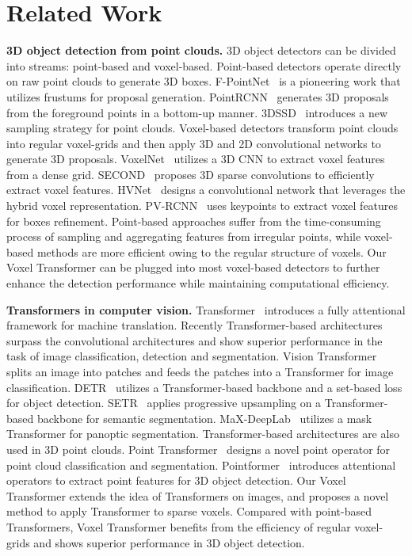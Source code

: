 \documentclass[10pt,twocolumn,letterpaper]{article}
\begin{document}
\section{Related Work}
\noindent\textbf{3D object detection from point clouds.} 3D object detectors can be divided into  streams: point-based and voxel-based. Point-based detectors operate directly on raw point clouds to generate 3D boxes. F-PointNet~\cite{qi2018frustum} is a pioneering work that utilizes frustums for proposal generation. PointRCNN~\cite{shi2019pointrcnn} generates 3D proposals from the foreground points in a bottom-up manner. 3DSSD~\cite{yang20203dssd} introduces a new sampling strategy for point clouds. Voxel-based detectors transform point clouds into regular voxel-grids and then apply 3D and 2D convolutional networks to generate 3D proposals. VoxelNet~\cite{zhou2018voxelnet} utilizes a 3D CNN to extract voxel features from a dense grid. SECOND~\cite{yan2018second} proposes 3D sparse convolutions to efficiently extract voxel features. HVNet~\cite{ye2020hvnet} designs a convolutional network that leverages the hybrid voxel representation. PV-RCNN~\cite{shi2020pv} uses keypoints to extract voxel features for boxes refinement. Point-based approaches suffer from the time-consuming process of sampling and aggregating features from irregular points, while voxel-based methods are more efficient owing to the regular structure of voxels. Our Voxel Transformer can be plugged into most voxel-based detectors to further enhance the detection performance while maintaining computational efficiency.

\noindent\textbf{Transformers in computer vision.} Transformer~\cite{vaswani2017attention} introduces a fully attentional framework for machine translation. Recently Transformer-based architectures surpass the convolutional architectures and show superior performance in the task of image classification, detection and segmentation. Vision Transformer~\cite{dosovitskiy2020image} splits an image into patches and feeds the patches into a Transformer for image classification. DETR~\cite{carion2020end} utilizes a Transformer-based backbone and a set-based loss for object detection. SETR~\cite{zheng2020rethinking} applies progressive upsampling on a Transformer-based backbone for semantic segmentation. MaX-DeepLab~\cite{wang2020max} utilizes a mask Transformer for panoptic segmentation. Transformer-based architectures are also used in 3D point clouds. Point Transformer~\cite{zhao2020point} designs a novel point operator for point cloud classification and segmentation. Pointformer~\cite{pan20203d} introduces attentional operators to extract point features for 3D object detection. Our Voxel Transformer extends the idea of Transformers on images, and proposes a novel method to apply Transformer to sparse voxels. Compared with point-based Transformers, Voxel Transformer benefits from the efficiency of regular voxel-grids and shows superior performance in 3D object detection. 
\end{document}
